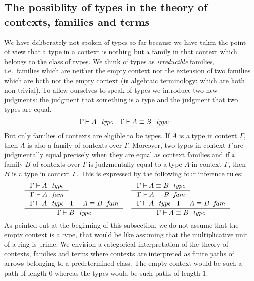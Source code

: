 \subsection{The possiblity of types in the theory of contexts, families and
terms}
\label{types}
We have deliberately not spoken of types so far because we have taken the point
of view that a type in a context is nothing but a family in that context which
belongs to the class of types. We think of types as \emph{irreducible} families,
i.e.\ families which are neither the empty context nor the extension of two
families which are both not the empty context (in algebraic terminology: which
are both non-trivial). To allow ourselves to speak of types we introduce two
new judgments: the judgment that something is a type and the judgment that two
types are equal.
\begin{align*}
\jtype*{\Gamma}{A} 
& \jtypeeq*{\Gamma}{A}{B}
\end{align*}
But only families of contexts are eligible to be types. If $A$ is a type
in context $\Gamma$, then $A$ is also a family of contexts over $\Gamma$. 
Moreover, two types in context $\Gamma$ are judgmentally equal precisely when they are equal
as context families and if a family $B$ of contexts over $\Gamma$ is
judgmentally equal to a type $A$ in context $\Gamma$, then $B$ is a type in
context $\Gamma$. This is expressed by the following four inference rules:
\begin{align*}
& \inference
  { \jtype{\Gamma}{A}
    }
  { \jfam{\Gamma}{A}
    }
& & \inference
    { \jtypeeq{\Gamma}{A}{B}
      }
    { \jfameq{\Gamma}{A}{B}
      }
    \\
& \inference
  { \jtype{\Gamma}{A}
    \jfameq{\Gamma}{A}{B}
    }
  { \jtype{\Gamma}{B}
    }
& & \inference
    { \jtype{\Gamma}{A}
      \jfameq{\Gamma}{A}{B}
      }
    { \jtypeeq{\Gamma}{A}{B}
      }
\end{align*}
As pointed out at the beginning of this subsection, 
we do not assume that the empty context is a type, that would be like
assuming that the multiplicative unit of a ring is prime. We envision a
categorical interpretation of the theory of contexts, families and terms where 
contexts are interpreted as finite paths of arrows belonging to a predetermined
class. The empty context would be such a path of length $0$ whereas the types
would be such paths of length $1$.

